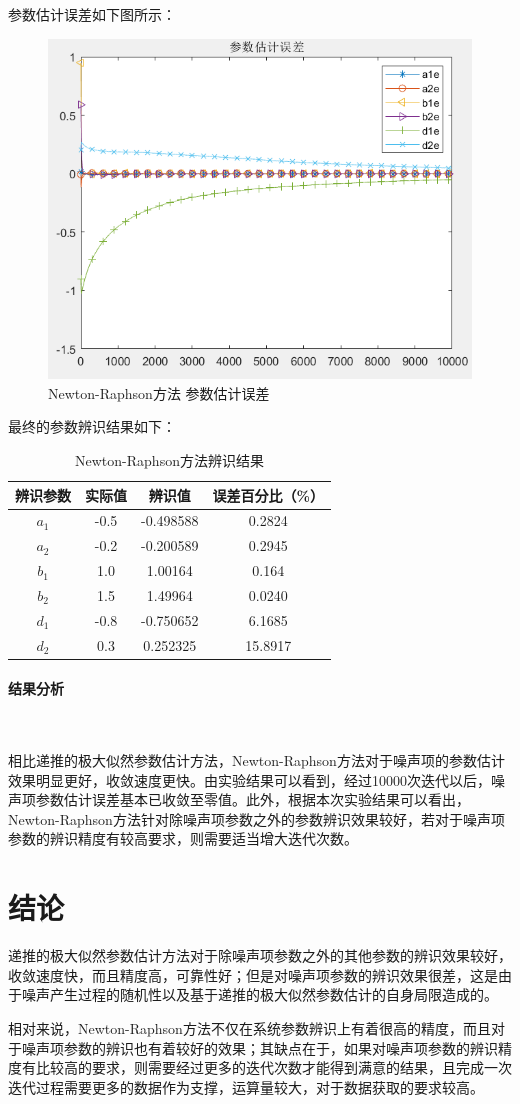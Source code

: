 \documentclass[UTF8]{article}
\begin{document}
参数估计误差如下图所示：
\begin{figure}[H]
    \centering %
    \includegraphics[width=.8\textwidth]{figure/newton_参数估计误差.png} 
    \caption{Newton-Raphson方法 参数估计误差} %
\end{figure}

最终的参数辨识结果如下：
\begin{table}[H] %
\centering %
\begin{tabular}{cccc} %
    \toprule %
    辨识参数 & 实际值 & 辨识值 & 误差百分比（\%） \\
    \midrule %
    $a_1$ & -0.5 & -0.498588 & 0.2824 \\
    $a_2$ & -0.2 & -0.200589 & 0.2945 \\
    $b_1$ & 1.0 & 1.00164 & 0.164 \\
    $b_2$ & 1.5 & 1.49964 & 0.0240 \\
    $d_1$ & -0.8 & -0.750652 & 6.1685 \\ 
    $d_2$ & 0.3 & 0.252325 & 15.8917 \\
    \bottomrule %
\end{tabular}
\caption{Newton-Raphson方法辨识结果} %
\end{table}


\paragraph{结果分析}~{}

相比递推的极大似然参数估计方法，Newton-Raphson方法对于噪声项的参数估计效果明显更好，收敛速度更快。由实验结果可以看到，经过10000次迭代以后，噪声项参数估计误差基本已收敛至零值。此外，根据本次实验结果可以看出，Newton-Raphson方法针对除噪声项参数之外的参数辨识效果较好，若对于噪声项参数的辨识精度有较高要求，则需要适当增大迭代次数。

%
\section{结论}
递推的极大似然参数估计方法对于除噪声项参数之外的其他参数的辨识效果较好，收敛速度快，而且精度高，可靠性好；但是对噪声项参数的辨识效果很差，这是由于噪声产生过程的随机性以及基于递推的极大似然参数估计的自身局限造成的。

相对来说，Newton-Raphson方法不仅在系统参数辨识上有着很高的精度，而且对于噪声项参数的辨识也有着较好的效果；其缺点在于，如果对噪声项参数的辨识精度有比较高的要求，则需要经过更多的迭代次数才能得到满意的结果，且完成一次迭代过程需要更多的数据作为支撑，运算量较大，对于数据获取的要求较高。
\end{document}
